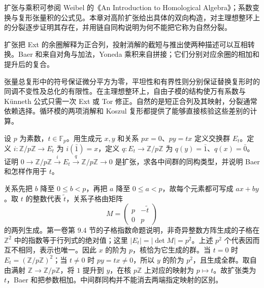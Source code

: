 \ProseParagraphBreak
扩张与乘积可参阅 Weibel 的《An Introduction to Homological Algebra》\cite[Section 3.4]{Weibel1994HomologicalAlgebra}；系数变换与复形张量积的公式见\cite[Section 3.6]{Weibel1994HomologicalAlgebra}。本章对高阶扩张给出具体的双向构造，对主理想整环上的分裂逐步证明其存在，并用链自同构说明为何不能把它称为自然分裂。






\begin{chaptersummary}
	扩张把 Ext 的余圈解释为正合列，投射消解的截短与推出使两种描述可以互相转换。Baer 和来自对角与加法，Yoneda 乘积来自拼接；它们分别对应余圈的相加和提升后的复合。

	\ProseParagraphBreak
	张量总复形中的符号保证微分平方为零，平坦性和有界性则分别保证替换复形时的同调不变性及总化的有限性。在主理想整环上，自由子模的结构使万有系数与 Künneth 公式只需一次 Ext 或 Tor 修正。自然的是短正合列及其映射，分裂通常依赖选择。循环模的两项消解和 Koszul 复形都提供了能够直接核验这些差别的计算。
\end{chaptersummary}

\BookExercises

\begin{exercise}\label{b4:ex:09-extensions-parameters}
	设 \(p\) 为素数，\(t\in\mathbb F_p\)。用生成元 \(x,y\) 和关系 \(px=0\)、\(py=tx\) 定义交换群 \(E_t\)。定义 \(i:\mathbb Z/p\mathbb Z\to E_t\) 为 \(i(\bar1)=x\)，定义 \(q:E_t\to\mathbb Z/p\mathbb Z\) 为 \(q(y)=\bar1\)、\(q(x)=\bar0\)。证明 \(0\to\mathbb Z/p\mathbb Z\xrightarrow{i}E_t\xrightarrow{q}\mathbb Z/p\mathbb Z\to0\) 是扩张，求各中间群的同构类型，并说明 Baer 和怎样作用于 \(t\)。
\end{exercise}
\begin{solution}
	关系先把 \(b\) 降至 \(0\le b<p\)，再把 \(a\) 降至 \(0\le a<p\)，故每个元素都可写成 \(a x+b y\)。取 \(t\) 的整数代表 \(\widetilde t\)，关系子格由矩阵
	\[
		M=\begin{pmatrix}p&-\widetilde t\\0&p\end{pmatrix}
	\]
	的两列生成。第一卷第 9.4 节的子格指数命题说明，非奇异整数方阵生成的子格在 \(\mathbb Z^2\) 中的指数等于行列式的绝对值；这里 \(|E_t|=|\det M|=p^2\)。上述 \(p^2\) 个代表因而互不相同，表示也唯一。因此 \(x\) 的阶为 \(p\)，核恰为它生成的群。当 \(t=0\) 时 \(E_t=(\mathbb Z/p\mathbb Z)^2\)；当 \(t\ne0\) 时 \(py=tx\ne0\)，所以 \(y\) 的阶为 \(p^2\)，且生成全群。取自由满射 \(\mathbb Z\to\mathbb Z/p\mathbb Z\)，将 \(1\) 提升到 \(y\)，在核 \(p\mathbb Z\) 上对应的映射为 \(p\mapsto t\)。故扩张类为 \(t\)，Baer 和把参数相加。中间群同构并不能消去两端指定映射的区别。
\end{solution}

